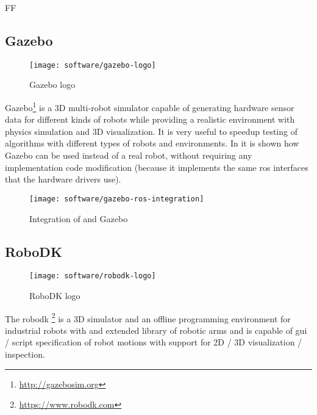 FF

\subsection{Gazebo}

\begin{wrapfigure}{r}{0.23\textwidth}
	\centering
	\vspace*{-2em}
	\texttt{[image: software/gazebo-logo]}
	\caption{Gazebo logo}
	\label{fig:gazebo-logo}
\end{wrapfigure}


Gazebo\footnote{\url{http://gazebosim.org}} is a 3D multi-robot simulator capable of generating hardware sensor data for different kinds of robots while providing a realistic environment with physics simulation and 3D visualization. It is very useful to speedup testing of algorithms with different types of robots and environments. In  it is shown how Gazebo can be used instead of a real robot, without requiring any implementation code modification (because it implements the same \gls{ros} interfaces that the hardware drivers use).

\begin{figure}[H]
	\centering
	\texttt{[image: software/gazebo-ros-integration]}
	\caption[Integration of  and Gazebo]{Integration of  and Gazebo\protect\footnotemark}
	\label{fig:gazebo-ros-integration}
\end{figure}


\subsection{RoboDK}

\begin{wrapfigure}{r}{0.23\textwidth}
	\centering
	\vspace*{-2em}
	\texttt{[image: software/robodk-logo]}
	\caption{RoboDK logo}
	\label{fig:robodk-logo}
\end{wrapfigure}

The \gls{robodk} \footnote{\url{https://www.robodk.com}} is a 3D simulator and an offline programming environment for industrial robots with and extended library of robotic arms and is capable of \gls{gui} / script specification of robot motions with support for 2D / 3D visualization / inspection.
